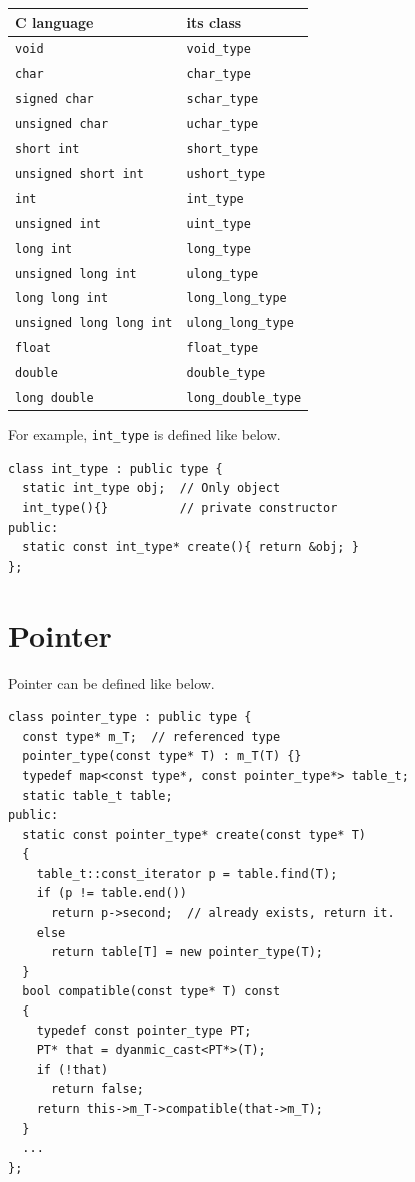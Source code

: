 \begin{tabular}{|l|l|} \hline
C language & its class \\ \hline
{\tt{void}} & {\tt{void\_type}} \\ \hline
{\tt{char}} & {\tt{char\_type}} \\  \hline
{\tt{signed char}} & {\tt{schar\_type}} \\  \hline
{\tt{unsigned char}} & {\tt{uchar\_type}} \\  \hline
{\tt{short int}} & {\tt{short\_type}} \\  \hline
{\tt{unsigned short int}} & {\tt{ushort\_type}} \\  \hline
{\tt{int}} & {\tt{int\_type}} \\ \hline
{\tt{unsigned int}} & {\tt{uint\_type}} \\  \hline
{\tt{long int}} & {\tt{long\_type}} \\ \hline
{\tt{unsigned long int}} & {\tt{ulong\_type}} \\ \hline
{\tt{long long int}} & {\tt{long\_long\_type}} \\ \hline
{\tt{unsigned long long int}} & {\tt{ulong\_long\_type}} \\ \hline
{\tt{float}} & {\tt{float\_type}} \\ \hline
{\tt{double}} & {\tt{double\_type}} \\ \hline
{\tt{long double}} & {\tt{long\_double\_type}} \\ \hline
\end{tabular}

\vspace{0.5cm}

For example, {\tt{int\_type}} is defined like below.
\begin{verbatim}
class int_type : public type {
  static int_type obj;  // Only object
  int_type(){}          // private constructor
public:
  static const int_type* create(){ return &obj; }
};
\end{verbatim}

\section{Pointer}
\label{type_e003}
Pointer can be defined like below.
\begin{verbatim}
class pointer_type : public type {
  const type* m_T;  // referenced type
  pointer_type(const type* T) : m_T(T) {}
  typedef map<const type*, const pointer_type*> table_t;
  static table_t table;
public:
  static const pointer_type* create(const type* T)
  {
    table_t::const_iterator p = table.find(T);
    if (p != table.end())
      return p->second;  // already exists, return it.
    else
      return table[T] = new pointer_type(T);
  }
  bool compatible(const type* T) const
  {
    typedef const pointer_type PT;
    PT* that = dyanmic_cast<PT*>(T);
    if (!that)
      return false;
    return this->m_T->compatible(that->m_T);
  }
  ...
};
\end{verbatim}

